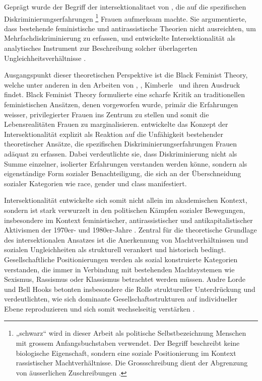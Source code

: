 Geprägt wurde der Begriff der \gls{intersektionalitaet} von \textcite{crenshawMappingMarginsIntersectionality1991}, die auf die spezifischen Diskriminierungserfahrungen \footnote{„\gls{schwarz}“ wird in dieser Arbeit als politische Selbstbezeichnung  Menschen mit grossem Anfangsbuchstaben verwendet. Der Begriff beschreibt keine biologische Eigenschaft, sondern eine soziale Positionierung im Kontext rassistischer Machtverhältnisse. Die Grossschreibung dient der Abgrenzung von äusserlichen Zuschreibungen \parencite{oguntoyeFarbeBekennenAfrodeutsche1986}.} Frauen aufmerksam machte. Sie argumentierte, dass bestehende feministische und antirassistische Theorien nicht ausreichten, um Mehrfachdiskriminierung zu erfassen, und entwickelte Intersektionalität als analytisches Instrument zur Beschreibung solcher überlagerten Ungleichheitsverhältnisse \parencite[\gls{vgl}][]{hancockWhenMultiplicationDoesnt2007}.

Ausgangspunkt dieser theoretischen Perspektive ist die Black Feminist Theory, welche unter anderen in den Arbeiten von \textcite{hooksAintWomanBlack1981}, \textcite{lordeSisterOutsiderEssays1984}, Kimberle~\textcite{crenshawMappingMarginsIntersectionality1991} und \textcite{collinsBlackFeministThought2002} ihren Ausdruck findet. Black Feminist Theory formulierte eine scharfe Kritik an traditionellen feministischen Ansätzen, denen vorgeworfen wurde, primär die Erfahrungen weisser, privilegierter Frauen ins Zentrum zu stellen und somit die Lebensrealitäten  Frauen zu marginalisieren. \textcite{crenshawMappingMarginsIntersectionality1991} entwickelte das Konzept der Intersektionalität explizit als Reaktion auf die Unfähigkeit bestehender theoretischer Ansätze, die spezifischen Diskriminierungserfahrungen  Frauen adäquat zu erfassen. Dabei verdeutlichte sie, dass Diskriminierung nicht als Summe einzelner, isolierter Erfahrungen verstanden werden könne, sondern als eigenständige Form sozialer Benachteiligung, die sich an der Überschneidung sozialer Kategorien wie \gls{race}, \gls{gender} und \gls{class} manifestiert.

Intersektionalität entwickelte sich somit nicht allein im akademischen Kontext, sondern ist stark verwurzelt in den politischen Kämpfen sozialer Bewegungen, insbesondere im Kontext feministischer, antirassistischer und antikapitalistischer Aktivismen der 1970er- und 1980er-Jahre \parencite{collinsBlackFeministThought2002}. Zentral für die theoretische Grundlage des intersektionalen Ansatzes ist die Anerkennung von Machtverhältnissen und sozialen Ungleichheiten als strukturell verankert und historisch bedingt. Gesellschaftliche Positionierungen werden als sozial konstruierte Kategorien verstanden, die immer in Verbindung mit bestehenden Machtsystemen wie Sexismus, Rassismus oder Klassismus betrachtet werden müssen. Audre Lorde und Bell Hooks betonten insbesondere die Rolle struktureller Unterdrückung und verdeutlichten, wie sich dominante Gesellschaftsstrukturen auf individueller Ebene reproduzieren und sich somit wechselseitig verstärken \parencite{collinsBlackFeministThought2002, hancockWhenMultiplicationDoesnt2007}.

